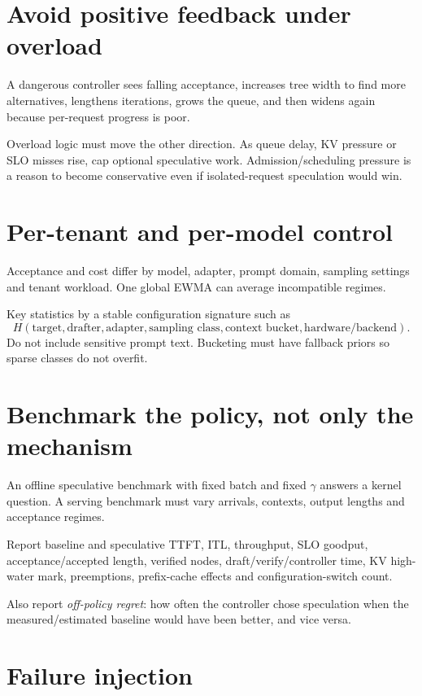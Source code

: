 \section{Avoid positive feedback under overload}

A dangerous controller sees falling acceptance, increases tree width to find more
alternatives, lengthens iterations, grows the queue, and then widens again because
per-request progress is poor.

Overload logic must move the other direction. As queue delay, KV pressure or SLO misses
rise, cap optional speculative work. Admission/scheduling pressure is a reason to
become conservative even if isolated-request speculation would win.

\section{Per-tenant and per-model control}

Acceptance and cost differ by model, adapter, prompt domain, sampling settings and
tenant workload. One global EWMA can average incompatible regimes.

Key statistics by a stable configuration signature such as
\[
H(\text{target},\text{drafter},\text{adapter},\text{sampling class},
\text{context bucket},\text{hardware/backend}).
\]
Do not include sensitive prompt text. Bucketing must have fallback priors so sparse
classes do not overfit.

\section{Benchmark the policy, not only the mechanism}

An offline speculative benchmark with fixed batch and fixed $\gamma$ answers a kernel
question. A serving benchmark must vary arrivals, contexts, output lengths and
acceptance regimes.

Report baseline and speculative TTFT, ITL, throughput, SLO goodput, acceptance/accepted
length, verified nodes, draft/verify/controller time, KV high-water mark, preemptions,
prefix-cache effects and configuration-switch count.

Also report \emph{off-policy regret}: how often the controller chose speculation when
the measured/estimated baseline would have been better, and vice versa.

\section{Failure injection}

